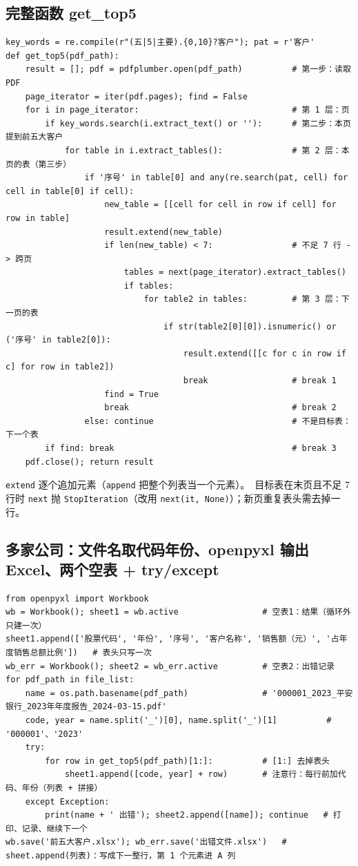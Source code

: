\subsection{完整函数 get\_top5}
\begin{lstlisting}[style=pyD07]
key_words = re.compile(r"(五|5|主要).{0,10}?客户"); pat = r'客户'
def get_top5(pdf_path):
    result = []; pdf = pdfplumber.open(pdf_path)          # 第一步：读取 PDF
    page_iterator = iter(pdf.pages); find = False
    for i in page_iterator:                               # 第 1 层：页
        if key_words.search(i.extract_text() or ''):      # 第二步：本页提到前五大客户
            for table in i.extract_tables():              # 第 2 层：本页的表（第三步）
                if '序号' in table[0] and any(re.search(pat, cell) for cell in table[0] if cell):
                    new_table = [[cell for cell in row if cell] for row in table]
                    result.extend(new_table)
                    if len(new_table) < 7:                # 不足 7 行 -> 跨页
                        tables = next(page_iterator).extract_tables()
                        if tables:
                            for table2 in tables:         # 第 3 层：下一页的表
                                if str(table2[0][0]).isnumeric() or ('序号' in table2[0]):
                                    result.extend([[c for c in row if c] for row in table2])
                                    break                 # break 1
                    find = True
                    break                                 # break 2
                else: continue                            # 不是目标表：下一个表
        if find: break                                    # break 3
    pdf.close(); return result
\end{lstlisting}
\texttt{extend} 逐个追加元素（\texttt{append} 把整个列表当一个元素）。\tagext\ 目标表在末页且不足 7 行时 \texttt{next} 抛 \texttt{StopIteration}（改用 \texttt{next(it, None)}）；新页重复表头需去掉一行。

\subsection{多家公司：文件名取代码年份、openpyxl 输出 Excel、两个空表 + try/except}
\begin{lstlisting}[style=pyD07]
from openpyxl import Workbook
wb = Workbook(); sheet1 = wb.active                 # 空表1：结果（循环外只建一次）
sheet1.append(['股票代码', '年份', '序号', '客户名称', '销售额（元）', '占年度销售总额比例'])   # 表头只写一次
wb_err = Workbook(); sheet2 = wb_err.active         # 空表2：出错记录
for pdf_path in file_list:
    name = os.path.basename(pdf_path)               # '000001_2023_平安银行_2023年年度报告_2024-03-15.pdf'
    code, year = name.split('_')[0], name.split('_')[1]          # '000001'、'2023'
    try:
        for row in get_top5(pdf_path)[1:]:          # [1:] 去掉表头
            sheet1.append([code, year] + row)       # 注意行：每行前加代码、年份（列表 + 拼接）
    except Exception:
        print(name + ' 出错'); sheet2.append([name]); continue   # 打印、记录、继续下一个
wb.save('前五大客户.xlsx'); wb_err.save('出错文件.xlsx')   # sheet.append(列表)：写成下一整行，第 1 个元素进 A 列
\end{lstlisting}

